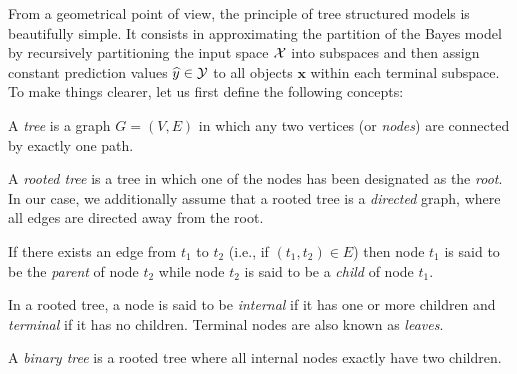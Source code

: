 From a geometrical point of view, the principle of tree structured models is
beautifully simple. It consists in approximating the partition of the Bayes
model by recursively partitioning the input space ${\cal X}$ into subspaces and
then assign constant prediction values $\widehat{y}\in{\cal Y}$ to all objects
$\mathbf{x}$ within each terminal subspace. To make things clearer, let us
first define the following concepts:

\begin{definition}
A \emph{tree} is a graph $G=(V,E)$ in which any two vertices (or \emph{nodes})
are connected by exactly one path.
\end{definition}

\begin{definition}
A \emph{rooted tree} is a tree in which one of the nodes has been designated as
the \emph{root}. In our case, we additionally assume that a rooted tree is a
\emph{directed} graph, where all edges are directed away from the root.
\end{definition}

\begin{definition}
If there exists an edge from $t_1$ to $t_2$ (i.e., if $(t_1, t_2)\in E$) then
node $t_1$ is said to be the \emph{parent} of node $t_2$ while node $t_2$ is
said to be a \emph{child} of node $t_1$.
\end{definition}

\begin{definition}
In a rooted tree, a node is said to be \emph{internal} if it has one or more
children and \emph{terminal} if it has no children. Terminal nodes are also
known as \emph{leaves}.
\end{definition}

\begin{definition}
A \emph{binary tree} is a rooted tree where all internal nodes exactly
have two children.
\end{definition}

